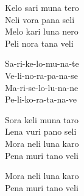 \begin{lyrics}
Kelo sari muna tero\\
Neli vora pana seli\\
Melo kari luna nero\\
Peli nora tana veli

Sa-ri-ke-lo-mu-na-te\\
Ve-li-no-ra-pa-na-se\\
Ma-ri-se-lo-lu-na-ne\\
Pe-li-ko-ra-ta-na-ve

Sora keli muna taro\\
Lena vuri pano seli\\
Mora neli luna karo\\
Pena muri tano veli

Mora neli luna karo\\
Pena muri tano veli
\end{lyrics}

